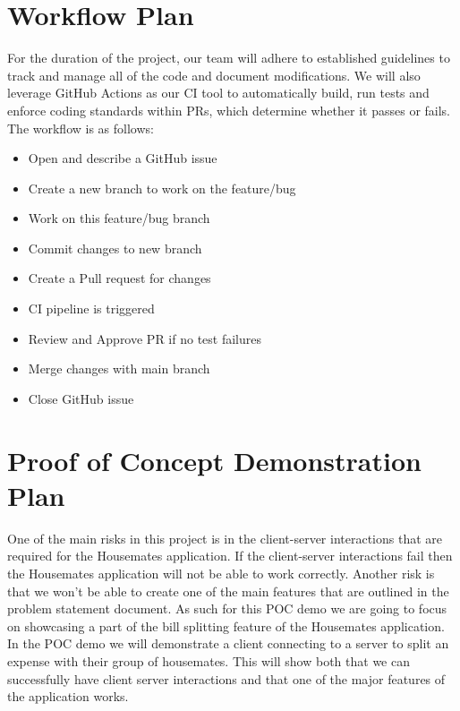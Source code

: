 \documentclass{article}
\begin{document}
\section{Workflow Plan}
    For the duration of the project, our team will adhere to established guidelines to track and manage all of the code and document modifications. We will also leverage GitHub Actions as our CI tool to automatically build, run tests and enforce coding standards within PRs, which determine whether it passes or fails. The workflow is as follows:
    \begin{itemize}
        \item Open and describe a GitHub issue
        \item Create a new branch to work on the feature/bug
        \item Work on this feature/bug branch
        \item Commit changes to new branch
        \item Create a Pull request for changes
        \item CI pipeline is triggered
        \item Review and Approve PR if no test failures
        \item Merge changes with main branch
        \item Close GitHub issue
    \end{itemize}
    

\section{Proof of Concept Demonstration Plan}
    One of the main risks in this project is in the client-server interactions that are required for the Housemates application. If the client-server interactions fail then the Housemates application will not be able to work correctly. Another risk is that we won't be able to create one of the main features that are outlined in the problem statement document. As such for this POC demo we are going to focus on showcasing a part of the bill splitting feature of the Housemates application. In the POC demo we will demonstrate a client connecting to a server to split an expense with their group of housemates. This will show both that we can successfully have client server interactions and that one of the major features of the application works.
    
\end{document}
